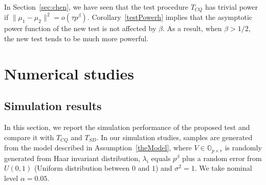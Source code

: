 \documentclass[review]{elsarticle}
\theoremstyle{plain}
\theoremstyle{definition}
\theoremstyle{remark}
\begin{document}
 In Section~\ref{sec:chen}, we have seen that the test procedure $T_{CQ}$ has trivial power if $\|\mu_1-\mu_2\|^2=o(\tau p^{\beta})$.
Corollary~\ref{testPowerh} implies that the asymptotic power function of the new test is not affected by $\beta$.
 As a result, when $\beta>1/2$, the new test tends to be much more powerful.





\section{Numerical studies}
\subsection{Simulation results}


In this section, we report the simulation performance of the proposed test and compare it with $T_{CQ}$ and $T_{SD}$.
In our simulation studies, samples are generated from the model described in Assumption~\ref{theModel},   
    where $V\in\mathbb{O}_{p\times r}$ is randomly generated from Haar invariant distribution, $\lambda_{i}$ equals $p^{\beta}$ plus a random error from $U(0,1)$ (Uniform distribution between $0$ and $1$) and $\sigma^2=1$.
We take nominal level $\alpha=0.05$.

\end{document}
